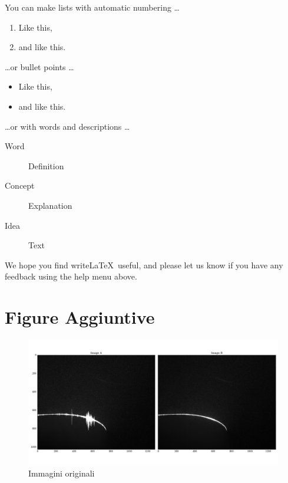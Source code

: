 \documentclass[a4paper]{article}
\begin{document}
You can make lists with automatic numbering \dots

\begin{enumerate}
\item Like this,
\item and like this.
\end{enumerate}
\dots or bullet points \dots
\begin{itemize}
\item Like this,
\item and like this.
\end{itemize}
\dots or with words and descriptions \dots
\begin{description}
\item[Word] Definition
\item[Concept] Explanation
\item[Idea] Text
\end{description}

We hope you find write\LaTeX\ useful, and please let us know if you have any feedback using the help menu above.

\newpage

\section{Figure Aggiuntive}

\begin{figure}[h]
	\centering
	\includegraphics[width=1\textwidth]{images/raw_images.png}
	\caption{\label{fig:img}Immagini originali}
\end{figure}
\end{document}
